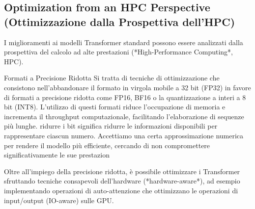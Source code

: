 \subsection{Optimization from an HPC Perspective (Ottimizzazione dalla Prospettiva dell'HPC)}

I miglioramenti ai modelli Transformer standard possono essere analizzati dalla prospettiva del calcolo ad alte prestazioni (*High-Performance Computing*, HPC).

\begin{definition}{Formati a Precisione Ridotta}
Si tratta di tecniche di ottimizzazione che consistono nell'abbandonare il formato in virgola mobile a 32 bit (FP32) in favore di formati a precisione ridotta come FP16, BF16 o la quantizzazione a interi a 8 bit (INT8). L'utilizzo di questi formati riduce l'occupazione di memoria e incrementa il throughput computazionale, facilitando l'elaborazione di sequenze più lunghe.
ridurre i bit significa ridurre le informazioni disponibili per rappresentare ciascun numero. Accettiamo una certa approssimazione numerica per rendere il modello più efficiente, cercando di non compromettere significativamente le sue prestazion
\end{definition}

Oltre all'impiego della precisione ridotta, è possibile ottimizzare i Transformer sfruttando tecniche consapevoli dell'hardware (*hardware-aware*), ad esempio implementando operazioni di auto-attenzione che ottimizzano le operazioni di input/output (IO-aware) sulle GPU.
\\


